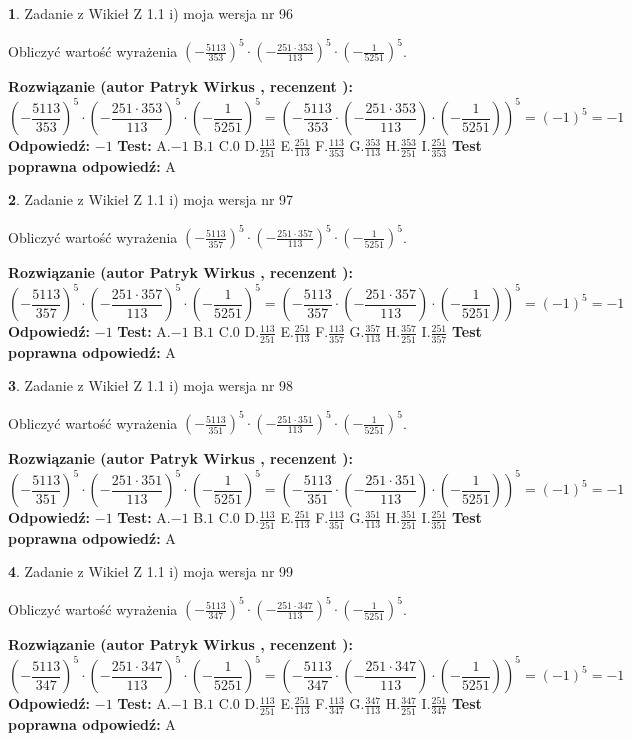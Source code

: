 \documentclass[12pt, a4paper]{article}
\theoremstyle{definition} %
\newtheorem{zad}{}
\newcommand{\zadStart}[1]{\begin{zad}#1\newline}
\newcommand{\zadStop}{\end{zad}}
\newcommand{\rozwStart}[2]{\noindent \textbf{Rozwiązanie (autor #1 , recenzent #2): }\newline}
\newcommand{\rozwStop}{\newline}
\newcommand{\odpStart}{\noindent \textbf{Odpowiedź:}\newline}
\newcommand{\odpStop}{\newline}
\newcommand{\testStart}{\noindent \textbf{Test:}\newline}
\newcommand{\testStop}{\newline}
\newcommand{\kluczStart}{\noindent \textbf{Test poprawna odpowiedź:}\newline}
\newcommand{\kluczStop}{\newline}
\begin{document}
\zadStart{Zadanie z Wikieł Z 1.1 i) moja wersja nr 96}

Obliczyć wartość wyrażenia $(-\frac{5113}{353})^{5} \cdot (-\frac{251 \cdot 353}{113})^{5} \cdot (-\frac{1}{5251})^{5}$.
\zadStop
\rozwStart{Patryk Wirkus}{}
$$(-\frac{5113}{353})^{5} \cdot (-\frac{251 \cdot 353}{113})^{5} \cdot (-\frac{1}{5251})^{5} = (-\frac{5113}{353} \cdot (-\frac{251 \cdot 353}{113}) \cdot (-\frac{1}{5251}))^{5} = (-1)^{5} = -1$$
\rozwStop
\odpStart
$-1$
\odpStop
\testStart
A.$-1$ B.$1$ C.$0$ D.$\frac{113}{251}$ E.$\frac{251}{113}$
F.$\frac{113}{353}$ G.$\frac{353}{113}$
H.$\frac{353}{251}$
I.$\frac{251}{353}$
\testStop
\kluczStart
A
\kluczStop



\zadStart{Zadanie z Wikieł Z 1.1 i) moja wersja nr 97}

Obliczyć wartość wyrażenia $(-\frac{5113}{357})^{5} \cdot (-\frac{251 \cdot 357}{113})^{5} \cdot (-\frac{1}{5251})^{5}$.
\zadStop
\rozwStart{Patryk Wirkus}{}
$$(-\frac{5113}{357})^{5} \cdot (-\frac{251 \cdot 357}{113})^{5} \cdot (-\frac{1}{5251})^{5} = (-\frac{5113}{357} \cdot (-\frac{251 \cdot 357}{113}) \cdot (-\frac{1}{5251}))^{5} = (-1)^{5} = -1$$
\rozwStop
\odpStart
$-1$
\odpStop
\testStart
A.$-1$ B.$1$ C.$0$ D.$\frac{113}{251}$ E.$\frac{251}{113}$
F.$\frac{113}{357}$ G.$\frac{357}{113}$
H.$\frac{357}{251}$
I.$\frac{251}{357}$
\testStop
\kluczStart
A
\kluczStop



\zadStart{Zadanie z Wikieł Z 1.1 i) moja wersja nr 98}

Obliczyć wartość wyrażenia $(-\frac{5113}{351})^{5} \cdot (-\frac{251 \cdot 351}{113})^{5} \cdot (-\frac{1}{5251})^{5}$.
\zadStop
\rozwStart{Patryk Wirkus}{}
$$(-\frac{5113}{351})^{5} \cdot (-\frac{251 \cdot 351}{113})^{5} \cdot (-\frac{1}{5251})^{5} = (-\frac{5113}{351} \cdot (-\frac{251 \cdot 351}{113}) \cdot (-\frac{1}{5251}))^{5} = (-1)^{5} = -1$$
\rozwStop
\odpStart
$-1$
\odpStop
\testStart
A.$-1$ B.$1$ C.$0$ D.$\frac{113}{251}$ E.$\frac{251}{113}$
F.$\frac{113}{351}$ G.$\frac{351}{113}$
H.$\frac{351}{251}$
I.$\frac{251}{351}$
\testStop
\kluczStart
A
\kluczStop



\zadStart{Zadanie z Wikieł Z 1.1 i) moja wersja nr 99}

Obliczyć wartość wyrażenia $(-\frac{5113}{347})^{5} \cdot (-\frac{251 \cdot 347}{113})^{5} \cdot (-\frac{1}{5251})^{5}$.
\zadStop
\rozwStart{Patryk Wirkus}{}
$$(-\frac{5113}{347})^{5} \cdot (-\frac{251 \cdot 347}{113})^{5} \cdot (-\frac{1}{5251})^{5} = (-\frac{5113}{347} \cdot (-\frac{251 \cdot 347}{113}) \cdot (-\frac{1}{5251}))^{5} = (-1)^{5} = -1$$
\rozwStop
\odpStart
$-1$
\odpStop
\testStart
A.$-1$ B.$1$ C.$0$ D.$\frac{113}{251}$ E.$\frac{251}{113}$
F.$\frac{113}{347}$ G.$\frac{347}{113}$
H.$\frac{347}{251}$
I.$\frac{251}{347}$
\testStop
\kluczStart
A
\kluczStop
\end{document}
